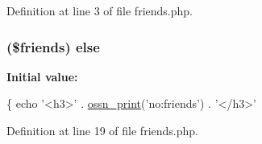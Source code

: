 Definition at line 3 of file friends.\+php.

\subsubsection[{\texorpdfstring{else}{else}}]{ (\$friends) else}\hypertarget{_ossn_profile_2plugins_2default_2profile_2modules_2friends_8php_a8daa37e6a3658227b53d42241a6fdeba}{}\label{_ossn_profile_2plugins_2default_2profile_2modules_2friends_8php_a8daa37e6a3658227b53d42241a6fdeba}
{\bfseries Initial value\+:}
\begin{DoxyCode}
\{
        echo \textcolor{stringliteral}{'<h3>'} . \hyperlink{ossn_8lib_8languages_8php_a2be5d1c4b695593a9b9067b96df2150a}{ossn\_print}(\textcolor{stringliteral}{'no:friends'}) . \textcolor{stringliteral}{'</h3>'}
\end{DoxyCode}


Definition at line 19 of file friends.\+php.

